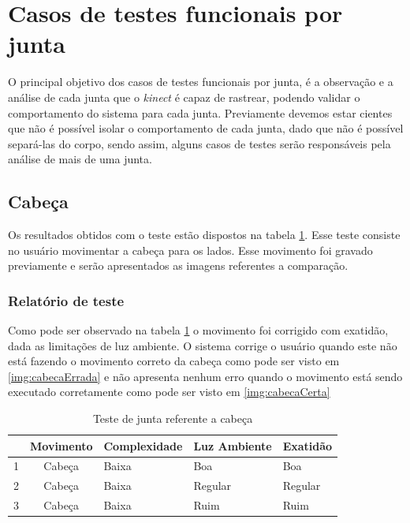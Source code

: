 \section{Casos de testes funcionais por junta}\label{sec:testes}
  O principal objetivo dos casos de testes funcionais por junta, é a observação e a análise de cada junta que o \textit{kinect} é capaz de rastrear, podendo validar
  o comportamento do sistema para cada junta. Previamente devemos estar cientes que não é possível isolar o comportamento de cada junta, dado que não é possível separá-las
  do corpo, sendo assim, alguns casos de testes serão responsáveis pela análise de mais de uma junta.

  \subsection{Cabeça}\label{sub:cabeca}
  Os resultados obtidos com o teste estão dispostos na tabela \ref{tab:cabeca}. Esse teste consiste no usuário movimentar a cabeça para os lados. Esse movimento
  foi gravado previamente e serão apresentados as imagens referentes a comparação.

  \subsubsection{Relatório de teste}\label{sub:cabeca}
  Como pode ser observado na tabela \ref{tab:cabeca} o movimento foi corrigido com exatidão, dada as limitações de luz ambiente. O sistema corrige o usuário quando este
  não está fazendo o movimento correto da cabeça como pode ser visto em \ref{img:cabecaErrada} e não apresenta nenhum erro quando o movimento está sendo executado
  corretamente como pode ser visto em \ref{img:cabecaCerta}

  \begin{table}[H]
  \centering
  \caption{Teste de junta referente a cabeça}
  \label{tab:cabeca}
  \begin{tabular}{@{}|c|c|l|l|l|@{}}
  \toprule
  \multicolumn{1}{|l|}{ } & \multicolumn{1}{l|}{\textbf{Movimento}} & \textbf{Complexidade} & \textbf{Luz Ambiente} & \textbf{Exatidão} \\ \midrule
  1                                 & Cabeça                     & Baixa                 & Boa                   & Boa               \\ \midrule
  2                                 & Cabeça                     & Baixa                 & Regular               & Regular           \\ \midrule
  3                                 & Cabeça                     & Baixa                 & Ruim                  & Ruim              \\ \bottomrule
  \end{tabular}
  \end{table}

